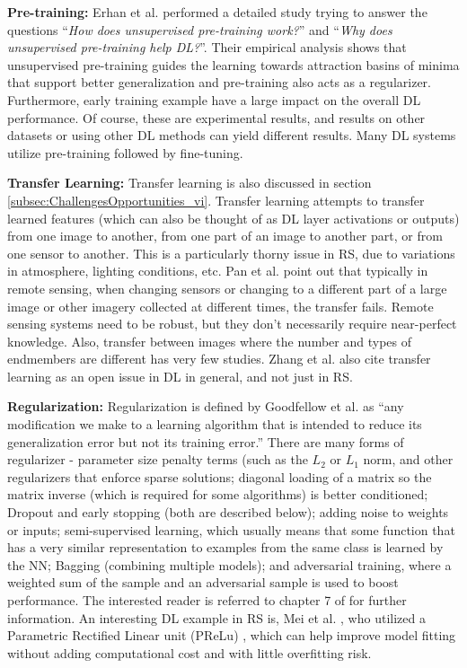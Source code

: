 \documentclass[12pt]{spieman}
\begin{document}
\begin{spacing}{1}
\textbf{Pre-training:} Erhan et al. \cite{Erhan2010} performed a detailed study trying to answer the questions ``\textit{How does unsupervised pre-training work?}'' and ``\textit{Why does unsupervised pre-training help DL?}''. Their empirical analysis shows that unsupervised pre-training guides the learning towards attraction basins of minima that support better generalization and pre-training also acts as a regularizer. Furthermore, early training example have a large impact on the overall DL performance. Of course, these are experimental results, and results on other datasets or using other DL methods can yield different results. Many DL systems utilize pre-training followed by fine-tuning.
    
\textbf{Transfer Learning:} Transfer learning is also discussed in section \ref{subsec:ChallengesOpportunities_vi}. Transfer learning attempts to transfer learned features (which can also be thought of as DL layer activations or outputs) from one image to another, from one part of an image to another part, or from one sensor to another. This is a particularly thorny issue in RS, due to variations in atmosphere, lighting conditions, etc. Pan et al. \cite{pan2010survey} point out that typically in remote sensing, when changing sensors or changing to a different part of a large image or other imagery collected at different times, the transfer fails. Remote sensing systems need to be robust, but they don't necessarily require near-perfect knowledge. Also, transfer between images where the number and types of endmembers are different has very few studies. Zhang et al. \cite{Zhang2016} also cite transfer learning as an open issue in DL in general, and not just in RS.
    
\textbf{Regularization:} Regularization is defined by Goodfellow et al. \cite{goodfellow2016deep} as ``any modification we make to a learning algorithm that is intended to reduce its generalization error but not its training error.'' There are many forms of regularizer - parameter size penalty terms (such as the $L_{2}$ or $L_{1}$ norm, and other regularizers that enforce sparse solutions; diagonal loading of a matrix so the matrix inverse (which is required for some algorithms) is better conditioned; Dropout and early stopping (both are described below); adding noise to weights or inputs; semi-supervised learning, which usually means that some function that has a very similar representation to examples from the same class is learned by the NN; Bagging (combining multiple models); and adversarial training, where a weighted sum of the sample and an adversarial sample is used to boost performance. The interested reader is referred to chapter 7 of \cite{goodfellow2016deep} for further information. An interesting DL example in RS is, Mei et al. \cite{Mei2016Integrating} , who utilized a Parametric Rectified Linear unit (PReLu) \cite{he2015delving} , which can help improve model fitting without adding computational cost and with little overfitting risk.
        

\end{spacing}
\end{document}
